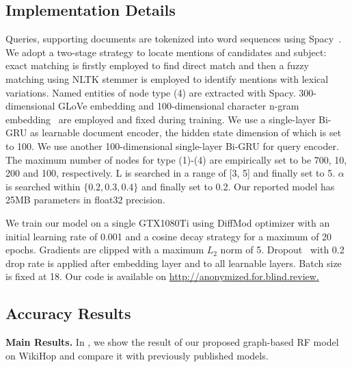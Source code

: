 \subsection{Implementation Details}
Queries, supporting documents are tokenized into word sequences using Spacy~\cite{spacy2}. We adopt a two-stage strategy to locate mentions of candidates and subject: exact matching is firstly employed to find direct match and then a fuzzy matching using NLTK stemmer is employed to identify mentions with lexical variations. Named entities of node type (4) are extracted with Spacy. 300-dimensional GLoVe embedding and 100-dimensional character n-gram embedding~\cite{hashimoto-etal-2017-joint} are employed and fixed during training. We use a single-layer Bi-GRU as learnable document encoder, the hidden state dimension of which is set to 100. We use another 100-dimensional single-layer Bi-GRU for query encoder. The maximum number of nodes for type (1)-(4) are empirically set to be 700, 10, 200 and 100, respectively. L is searched in a range of [3, 5] and finally set to 5. $\alpha$ is searched within $\{0.2, 0.3, 0.4\}$ and finally set to 0.2. Our reported model has 25MB parameters in float32 precision.

We train our model on a single GTX1080Ti using DiffMod optimizer with an initial learning rate of 0.001 and a cosine decay strategy for a maximum of 20 epochs. Gradients are clipped with a maximum $L_2$ norm of 5. Dropout~\cite{JMLR:v15:srivastava14a} with 0.2 drop rate is applied after embedding layer and to all learnable layers. Batch size is fixed at 18. Our code is available on \url{http://anonymized.for.blind.review.}
\subsection{Accuracy Results}
\textbf{Main Results. } In , we show the result of our proposed graph-based RF model on WikiHop and compare it with previously published models.

